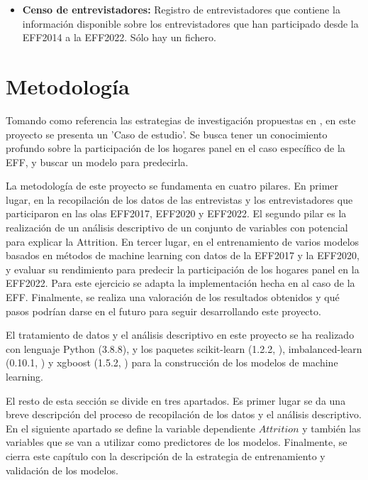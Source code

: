 \begin{itemize}
    \item \textbf{Censo de entrevistadores:} Registro de entrevistadores que contiene la información disponible sobre los entrevistadores que han participado desde la EFF2014 a la EFF2022. Sólo hay un fichero.
\end{itemize}

\section{Metodología}
\label{section:method}

Tomando como referencia las estrategias de investigación propuestas en \cite{oates2022researching}, en este proyecto se presenta un 'Caso de estudio'. Se busca tener un conocimiento profundo sobre la participación de los hogares panel en el caso específico de la EFF, y buscar un modelo para predecirla.

La metodología de este proyecto se fundamenta en cuatro pilares. En primer lugar, en la recopilación de los datos de las entrevistas y los entrevistadores que participaron en las olas EFF2017, EFF2020 y EFF2022. El segundo pilar es la realización de un análisis descriptivo de un conjunto de variables con potencial para explicar la Attrition. En tercer lugar, en el entrenamiento de varios modelos basados en métodos de machine learning con datos de la EFF2017 y la EFF2020, y evaluar su rendimiento para predecir la participación de los hogares panel en la EFF2022. Para este ejercicio se adapta la implementación hecha en \cite{beste2023case} al caso de la EFF. Finalmente, se realiza una valoración de los resultados obtenidos y qué pasos podrían darse en el futuro para seguir desarrollando este proyecto.

El tratamiento de datos y el análisis descriptivo en este proyecto se ha realizado con lenguaje Python (3.8.8), y los paquetes scikit-learn (1.2.2, \cite{pedregosa2011scikit}), imbalanced-learn (0.10.1, \cite{lemaavztre2017imbalanced}) y xgboost (1.5.2, \cite{chen2016xgboost}) para la construcción de los modelos de machine learning.

El resto de esta sección se divide en tres apartados. Es primer lugar se da una breve descripción del proceso de recopilación de los datos y el análisis descriptivo. En el siguiente apartado se define la variable dependiente $Attrition$ y también las variables que se van a utilizar como predictores de los modelos. Finalmente, se cierra este capítulo con la descripción de la estrategia de entrenamiento y validación de los modelos.

